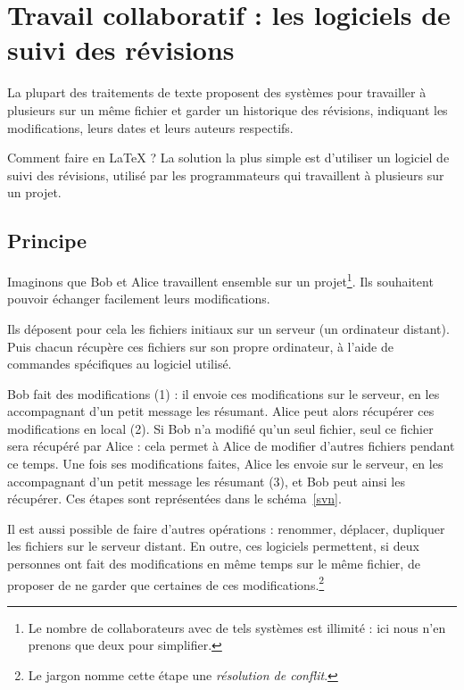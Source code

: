 \chapter{Travail collaboratif : les logiciels de suivi des révisions}\label{principesvn}    %

\begin{intro}
    La plupart des traitements de texte proposent des systèmes pour travailler à plusieurs sur un même fichier et garder un historique des révisions, indiquant les modifications, leurs dates et leurs auteurs respectifs. 
    
    Comment faire en \LaTeX{} ? La solution la plus simple est d'utiliser un logiciel de suivi des révisions, utilisé par les programmateurs qui travaillent à plusieurs sur un projet.
\end{intro}

\section{Principe}
Imaginons que Bob et Alice travaillent ensemble sur un projet\footnote{Le nombre de collaborateurs avec de tels systèmes est illimité : ici nous n'en prenons que deux pour simplifier.}. Ils souhaitent pouvoir échanger facilement leurs modifications.

Ils déposent  pour cela  les fichiers initiaux sur un serveur (un ordinateur distant). Puis chacun récupère ces fichiers sur son propre ordinateur, à l'aide de commandes spécifiques au logiciel utilisé.

Bob fait des modifications (1) : il envoie ces modifications sur le serveur, en les accompagnant d'un petit message les résumant. Alice peut alors récupérer ces modifications en local (2). Si Bob n'a modifié qu'un seul fichier, seul ce fichier sera récupéré par Alice : cela permet à Alice de modifier d'autres fichiers pendant ce temps. Une fois ses modifications faites, Alice les envoie sur le serveur, en les accompagnant d'un petit message les résumant (3), et Bob peut ainsi les récupérer. Ces étapes sont représentées dans le schéma~\ref{svn}. 

Il est aussi possible de faire d'autres opérations : renommer, déplacer, dupliquer les fichiers sur le serveur distant. En outre, ces logiciels permettent, si deux personnes ont fait des modifications en même temps sur le même fichier, de proposer de ne garder que certaines de ces modifications.\footnote{Le jargon nomme cette étape une \emph{résolution de conflit}.}

